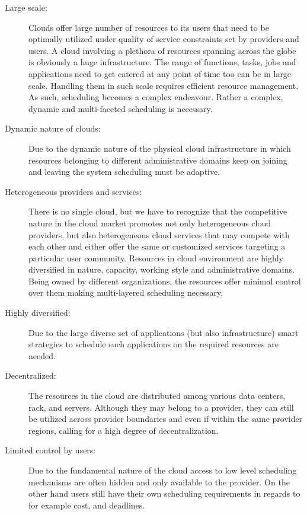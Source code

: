 \documentclass[final,5p,times,twocolumn]{elsarticle}
\begin{document}
\begin{description}

\item [Large scale:] Clouds offer large number of resources to its
  users that need to be optimally utilized under quality of service
  constraints set by providers and users. A cloud involving a plethora
  of resources spanning across the globe is obviously a huge
  infrastructure. The range of functions, tasks, jobs and applications
  need to get catered at any point of time too can be in large scale.
  Handling them in such scale requires efficient resource management.
  As such, scheduling becomes a complex endeavour. Rather a complex,
  dynamic and multi-faceted scheduling is necessary.
            
\item [Dynamic nature of clouds:] Due to the dynamic nature of the
  physical cloud infrastructure in which resources belonging to
  different administrative domains keep on joining and leaving the
  system scheduling must be adaptive.

\item[Heterogeneous providers and services:] There is no single cloud,
  but we have to recognize that the competitive nature in the cloud
  market promotes not only heterogeneous cloud providers, but also
  heterogeneous cloud services that may compete with each other and
  either offer the same or customized services targeting a particular
  user community. Resources in cloud environment are highly
  diversified in nature, capacity, working style and administrative
  domains. Being owned by different organizations, the resources offer
  minimal control over them making multi-layered scheduling necessary,

\item [Highly diversified:] Due to the large diverse set of
  applications (but also infrastructure) smart strategies to schedule
  such applications on the required resources are needed.

\item [Decentralized:] The resources in the cloud are distributed
  among various data centers, rack, and servers. Although they may
  belong to a provider, they can still be utilized across provider
  boundaries and even if within the same provider regions, calling for
  a high degree of decentralization.

\item[Limited control by users:] Due to the fundamental nature of the
  cloud access to low level scheduling mechanisms are often hidden and
  only available to the provider. On the other hand users still have
  their own scheduling requirements in regards to for example cost,
  and deadlines.
  

\end{description}
\end{document}
